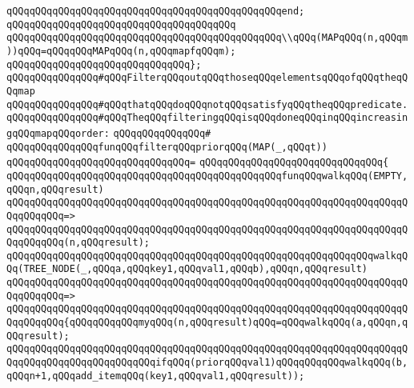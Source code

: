 \verb|qQQqqQQqqQQqqQQqqQQqqQQqqQQqqQQqqQQqqQQqqQQqqQQqend;|\newline
\verb|qQQqqQQqqQQqqQQqqQQqqQQqqQQqqQQqqQQqqQQq|\newline
\verb|qQQqqQQqqQQqqQQqqQQqqQQqqQQqqQQqqQQqqQQqqQQqqQQq\\qQQq(MAPqQQq(n,qQQqm))qQQq=qQQqqQQqMAPqQQq(n,qQQqmapfqQQqm);|\newline
\verb|qQQqqQQqqQQqqQQqqQQqqQQqqQQqqQQq};|\newline
\newline
\verb|qQQqqQQqqQQqqQQq#qQQqFilterqQQqoutqQQqthoseqQQqelementsqQQqofqQQqtheqQQqmap|\newline
\verb|qQQqqQQqqQQqqQQq#qQQqthatqQQqdoqQQqnotqQQqsatisfyqQQqtheqQQqpredicate.|\newline
\verb|qQQqqQQqqQQqqQQq#qQQqTheqQQqfilteringqQQqisqQQqdoneqQQqinqQQqincreasingqQQqmapqQQqorder:|\newline
\verb|qQQqqQQqqQQqqQQq#|\newline
\verb|qQQqqQQqqQQqqQQqfunqQQqfilterqQQqpriorqQQq(MAP(_,qQQqt))|\newline
\verb|qQQqqQQqqQQqqQQqqQQqqQQqqQQqqQQq=|\newline
\verb|qQQqqQQqqQQqqQQqqQQqqQQqqQQqqQQq{|\newline
\verb|qQQqqQQqqQQqqQQqqQQqqQQqqQQqqQQqqQQqqQQqqQQqqQQqfunqQQqwalkqQQq(EMPTY,qQQqn,qQQqresult)|\newline
\verb|qQQqqQQqqQQqqQQqqQQqqQQqqQQqqQQqqQQqqQQqqQQqqQQqqQQqqQQqqQQqqQQqqQQqqQQqqQQqqQQq=>|\newline
\verb|qQQqqQQqqQQqqQQqqQQqqQQqqQQqqQQqqQQqqQQqqQQqqQQqqQQqqQQqqQQqqQQqqQQqqQQqqQQqqQQq(n,qQQqresult);|\newline
\newline
\verb|qQQqqQQqqQQqqQQqqQQqqQQqqQQqqQQqqQQqqQQqqQQqqQQqqQQqqQQqqQQqqQQqwalkqQQq(TREE_NODE(_,qQQqa,qQQqkey1,qQQqval1,qQQqb),qQQqn,qQQqresult)|\newline
\verb|qQQqqQQqqQQqqQQqqQQqqQQqqQQqqQQqqQQqqQQqqQQqqQQqqQQqqQQqqQQqqQQqqQQqqQQqqQQqqQQq=>|\newline
\verb|qQQqqQQqqQQqqQQqqQQqqQQqqQQqqQQqqQQqqQQqqQQqqQQqqQQqqQQqqQQqqQQqqQQqqQQqqQQqqQQq{qQQqqQQqqQQqmyqQQq(n,qQQqresult)qQQq=qQQqwalkqQQq(a,qQQqn,qQQqresult);|\newline
\newline
\verb|qQQqqQQqqQQqqQQqqQQqqQQqqQQqqQQqqQQqqQQqqQQqqQQqqQQqqQQqqQQqqQQqqQQqqQQqqQQqqQQqqQQqqQQqqQQqqQQqifqQQq(priorqQQqval1)qQQqqQQqqQQqwalkqQQq(b,qQQqn+1,qQQqadd_itemqQQq(key1,qQQqval1,qQQqresult));|\newline
